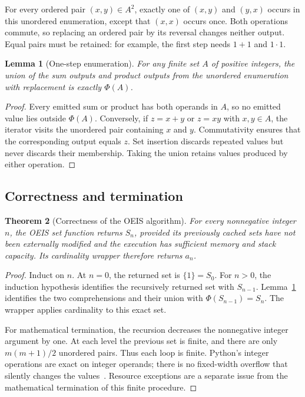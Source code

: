 \documentclass[11pt,a4paper]{article}
\newtheorem{theorem}{Theorem}[section]
\newtheorem{lemma}[theorem]{Lemma}
\theoremstyle{definition}
\theoremstyle{remark}
\begin{document}
For every ordered pair $(x,y)\in A^2$, exactly one of $(x,y)$ and $(y,x)$
occurs in this unordered enumeration, except that $(x,x)$ occurs once.
Both operations commute, so replacing an ordered pair by its reversal
changes neither output. Equal pairs must be retained: for example, the
first step needs $1+1$ and $1\cdot1$.

\begin{lemma}[One-step enumeration]\label{lem:onestep}
For any finite set $A$ of positive integers, the union of the sum outputs
and product outputs from the unordered enumeration with replacement is
exactly $\Phi(A)$.
\end{lemma}
\begin{proof}
Every emitted sum or product has both operands in $A$, so no emitted value
lies outside $\Phi(A)$. Conversely, if $z=x+y$ or $z=xy$ with $x,y\in A$,
the iterator visits the unordered pair containing $x$ and $y$.
Commutativity ensures that the corresponding output equals $z$.
Set insertion discards repeated values but never discards their membership.
Taking the union retains values produced by either operation.
\end{proof}

\subsection{Correctness and termination}
\begin{theorem}[Correctness of the OEIS algorithm]\label{thm:correct}
For every nonnegative integer $n$, the OEIS set function returns $S_n$,
provided its previously cached sets have not been externally modified and
the execution has sufficient memory and stack capacity. Its cardinality
wrapper therefore returns $a_n$.
\end{theorem}
\begin{proof}
Induct on $n$. At $n=0$, the returned set is $\{1\}=S_0$.
For $n>0$, the induction hypothesis identifies the recursively returned
set with $S_{n-1}$. Lemma~\ref{lem:onestep} identifies the two comprehensions
and their union with $\Phi(S_{n-1})=S_n$.
The wrapper applies cardinality to this exact set.

For mathematical termination, the recursion decreases the nonnegative
integer argument by one. At each level the previous set is finite, and
there are only $m(m+1)/2$ unordered pairs. Thus each loop is finite.
Python's integer operations are exact on integer operands; there is no
fixed-width overflow that silently changes the values~\cite{types,math}.
Resource exceptions are a separate issue from the mathematical termination
of this finite procedure.
\end{proof}
\end{document}
